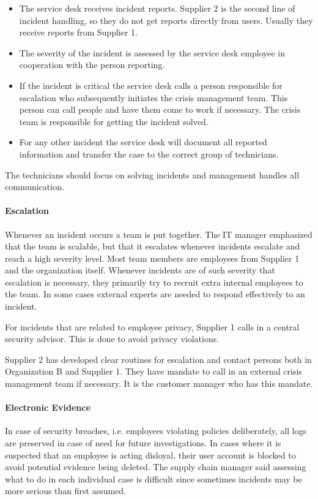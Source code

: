 \begin{itemize}
\item The service desk receives incident reports. Supplier 2 is the second line of incident handling, so they do not get reports directly from users. Usually they receive reports from Supplier 1.
\item The severity of the incident is assessed by the service desk employee in cooperation with the person reporting.
\item If the incident is critical the service desk calls a person responsible for escalation who subsequently initiates the crisis management team. This person can call people and have them come to work if necessary. The crisis team is responsible for getting the incident solved.
\item For any other incident the service desk will document all reported information and transfer the case to the correct group of technicians.
\end{itemize}

The technicians should focus on solving incidents and management handles all communication. 

\paragraph{Escalation}
Whenever an incident occurs a team is put together. The IT manager emphasized that the team is scalable, but that it escalates whenever incidents escalate and reach a high severity level. Most team members are employees from Supplier 1 and the organization itself. Whenever incidents are of such severity that escalation is necessary, they primarily try to recruit extra internal employees to the team. In some cases external experts are needed to respond effectively to an incident.

For incidents that are related to employee privacy, Supplier 1 calls in a central security advisor. This is done to avoid privacy violations.

Supplier 2 has developed clear routines for escalation and contact persons both in Organization B and Supplier 1. They have mandate to call in an external crisis management team if necessary. It is the customer manager who has this mandate. 

\paragraph{Electronic Evidence}
In case of security breaches, i.e. employees violating policies deliberately, all logs are preserved in case of need for future investigations. In cases where it is suspected that an employee is acting disloyal, their user account is blocked to avoid potential evidence being deleted. The supply chain manager said assessing what to do in each individual case is difficult since sometimes incidents may be more serious than first assumed. 

